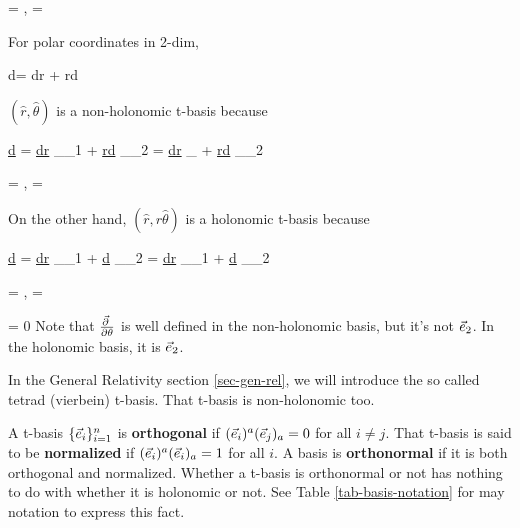 \beq
 =
,\quad
{}
=
\eeq



\beq
{}
\eeq
For polar coordinates in 2-dim,

\beq
d\vecr =
dr  + rd\theta \hat{\theta}
\eeq

$(\hat{r}, \hat{\theta})$ is a non-holonomic t-basis because

\beq
\ul{d\vecr} =
\ul{dr}
 _{\vece_1}
+ 
\ul{rd\theta} 
\underbrace{\hat{\theta}}_{\vece_2}
=
\ul{dr} 
_{}
+
\ul{rd\theta}
_{\vece_2}
\eeq

\beq
 =
,
\quad
\oper
{\pder{\vecr}{\theta}}
=\pder{\;}{\theta}
\eeq

\beq
{}
\eeq
On the other hand,
$(\hat{r}, r\hat{\theta})$
is a holonomic t-basis because

\beq
\ul{d\vecr} =
\ul{dr} 
_{\vece_1} 
+ 
\ul{d\theta} 
_{\vece_2}
=
\ul{dr}
_{\vece_1}
+
\ul{d\theta} 
\underbrace{\pder{\vecr}{\theta}}_{\vece_2}
\eeq

\beq
{}=
,
\quad
\oper{\pder{\vecr}{\theta}}
=\pder{\;}{\theta}
\eeq

\beq
{}= 0
\eeq
Note that $\frac{\vec{\partial}\;}{\partial\theta}$
is well defined in
the non-holonomic basis, but 
it's not ${\vec{e}}_2$.
In the holonomic basis, it is ${\vec{e}}_2$.

In the General Relativity section \ref{sec-gen-rel},
we will introduce
the so called tetrad
(vierbein) t-basis. That t-basis is non-holonomic too.


A t-basis 
$\{{\vec{e}}_i\}_{i=1}^n$ is {\bf orthogonal} if
$({\vec{e}}_i)^a 
({\vec{e}}_j)_a=0$ for all $i\neq j$. That t-basis is said to be {\bf normalized} if $({\vec{e}}_i)^a 
({\vec{e}}_i)_a= 1$
for all $i$.
A basis is {\bf orthonormal} if it is
both  orthogonal
and normalized.
Whether a t-basis
is orthonormal or not has nothing to
do with whether it is holonomic or not. See Table
\ref{tab-basis-notation}
for may notation to express this
fact.

